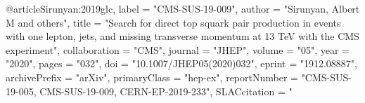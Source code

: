 @article{Sirunyan:2019glc,
      label          = "CMS-SUS-19-009",
      author         = "Sirunyan, Albert M and others",
      title          = "{Search for direct top squark pair production in events
                        with one lepton, jets, and missing transverse momentum at
                        13 TeV with the CMS experiment}",
      collaboration  = "CMS",
      journal        = "JHEP",
      volume         = "05",
      year           = "2020",
      pages          = "032",
      doi            = "10.1007/JHEP05(2020)032",
      eprint         = "1912.08887",
      archivePrefix  = "arXiv",
      primaryClass   = "hep-ex",
      reportNumber   = "CMS-SUS-19-005, CMS-SUS-19-009, CERN-EP-2019-233",
      SLACcitation   = "%
}

